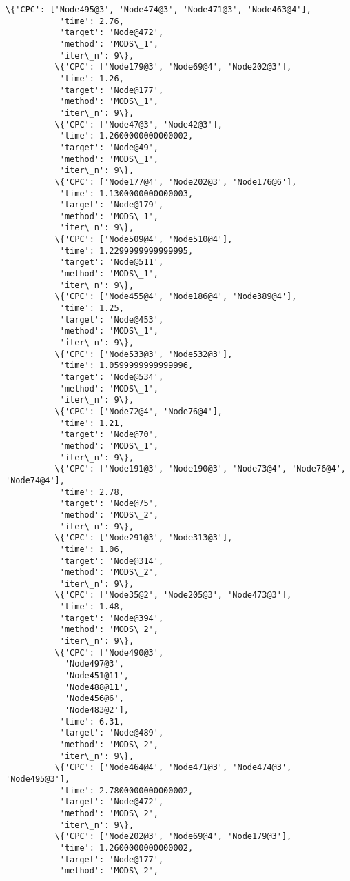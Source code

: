 \documentclass[11pt]{article}
\begin{document}
\begin{Verbatim}[commandchars=\\\{\}]
          \{'CPC': ['Node495@3', 'Node474@3', 'Node471@3', 'Node463@4'],
           'time': 2.76,
           'target': 'Node@472',
           'method': 'MODS\_1',
           'iter\_n': 9\},
          \{'CPC': ['Node179@3', 'Node69@4', 'Node202@3'],
           'time': 1.26,
           'target': 'Node@177',
           'method': 'MODS\_1',
           'iter\_n': 9\},
          \{'CPC': ['Node47@3', 'Node42@3'],
           'time': 1.2600000000000002,
           'target': 'Node@49',
           'method': 'MODS\_1',
           'iter\_n': 9\},
          \{'CPC': ['Node177@4', 'Node202@3', 'Node176@6'],
           'time': 1.1300000000000003,
           'target': 'Node@179',
           'method': 'MODS\_1',
           'iter\_n': 9\},
          \{'CPC': ['Node509@4', 'Node510@4'],
           'time': 1.2299999999999995,
           'target': 'Node@511',
           'method': 'MODS\_1',
           'iter\_n': 9\},
          \{'CPC': ['Node455@4', 'Node186@4', 'Node389@4'],
           'time': 1.25,
           'target': 'Node@453',
           'method': 'MODS\_1',
           'iter\_n': 9\},
          \{'CPC': ['Node533@3', 'Node532@3'],
           'time': 1.0599999999999996,
           'target': 'Node@534',
           'method': 'MODS\_1',
           'iter\_n': 9\},
          \{'CPC': ['Node72@4', 'Node76@4'],
           'time': 1.21,
           'target': 'Node@70',
           'method': 'MODS\_1',
           'iter\_n': 9\},
          \{'CPC': ['Node191@3', 'Node190@3', 'Node73@4', 'Node76@4', 'Node74@4'],
           'time': 2.78,
           'target': 'Node@75',
           'method': 'MODS\_2',
           'iter\_n': 9\},
          \{'CPC': ['Node291@3', 'Node313@3'],
           'time': 1.06,
           'target': 'Node@314',
           'method': 'MODS\_2',
           'iter\_n': 9\},
          \{'CPC': ['Node35@2', 'Node205@3', 'Node473@3'],
           'time': 1.48,
           'target': 'Node@394',
           'method': 'MODS\_2',
           'iter\_n': 9\},
          \{'CPC': ['Node490@3',
            'Node497@3',
            'Node451@11',
            'Node488@11',
            'Node456@6',
            'Node483@2'],
           'time': 6.31,
           'target': 'Node@489',
           'method': 'MODS\_2',
           'iter\_n': 9\},
          \{'CPC': ['Node464@4', 'Node471@3', 'Node474@3', 'Node495@3'],
           'time': 2.7800000000000002,
           'target': 'Node@472',
           'method': 'MODS\_2',
           'iter\_n': 9\},
          \{'CPC': ['Node202@3', 'Node69@4', 'Node179@3'],
           'time': 1.2600000000000002,
           'target': 'Node@177',
           'method': 'MODS\_2',

\end{Verbatim}
\end{document}
